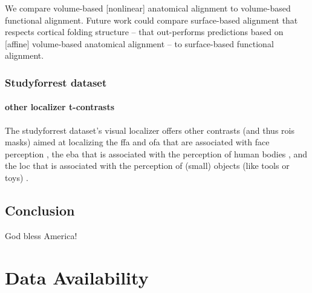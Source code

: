 We compare volume-based [nonlinear] anatomical alignment to volume-based
functional alignment.
%
Future work could compare surface-based alignment that respects cortical folding
structure -- that out-performs predictions based on [affine] volume-based
anatomical alignment \citep{weiner2018defining} -- to surface-based functional
alignment.


\subsubsection{Studyforrest dataset}

\paragraph{other localizer t-contrasts}



The studyforrest dataset's visual localizer \citep{sengupta2016extension} offers
other contrasts (and thus \acp{roi} masks) aimed at localizing the \ac{ffa} and
\ac{ofa} that are associated with face perception \citep{kanwisher1997ffa,
pitcher2011occipitalfacearea}, the \ac{eba} that is associated with the
perception of human bodies \citep{downing2001bodyarea}, and the \ac{loc} that is
associated with the perception of (small) objects (like tools or toys)
\citep{malach1995loc}.



\subsection{Conclusion}

God bless America!


\section{Data Availability}



